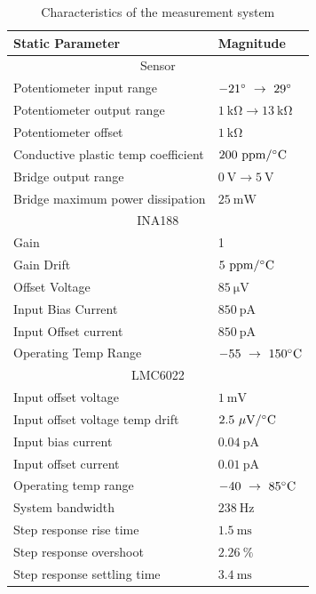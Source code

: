 \documentclass[10pt,twocolumn]{witseiepaper}
\begin{document}
\begin{table}[h!]
	\caption{Characteristics of the measurement system} \label{tab:static}
	\begin{tabular}{|p{}| p{}|}
		\hline
		\textbf{Static Parameter} & \textbf{Magnitude} \\ \hline
		\multicolumn{2}{|c|}{Sensor} \\ \hline
		Potentiometer input range & $-21^\circ~\rightarrow~29^\circ$\\
		Potentiometer output range & $\mathrm{1~k\Omega \rightarrow 13~k\Omega}$\\
		Potentiometer offset & $\mathrm{1~k\Omega}$\\
		Conductive plastic temp coefficient & $\mathrm{200~ppm/^\circ C}$ \\
		Bridge output range & $\mathrm{0~V \rightarrow 5~V}$\\
		Bridge maximum power dissipation & $\mathrm{25~mW}$ \\ \hline
		\multicolumn{2}{|c|}{INA188} \\ \hline
		Gain & 1\\
		Gain Drift & $\mathrm{5~ppm/^\circ C}$ \\
		Offset Voltage & $\mathrm{85~\mu V}$ \\
		Input Bias Current & $\mathrm{850~pA}$\\
		Input Offset current & $\mathrm{850~pA}$\\
		Operating Temp Range & $\mathrm{-55~\rightarrow~150^\circ C}$\\ \hline
		\multicolumn{2}{|c|}{LMC6022} \\ \hline
		Input offset voltage & $\mathrm{1~m V}$ \\
		Input offset voltage temp drift& $\mathrm{2.5~\mu V/ ^\circ C}$ \\
		Input bias current & $\mathrm{0.04~pA}$\\
		Input offset current & $\mathrm{0.01~pA}$\\
		Operating temp range & $\mathrm{-40~\rightarrow~85^\circ C}$\\ \hline
		System bandwidth & $238~\mathrm{Hz}$ \\
		Step response rise time & $1.5~\mathrm{ms}$ \\
		Step response overshoot & $2.26~\%$ \\
		Step response settling time & $3.4~\mathrm{ms}$ \\
		\hline
	\end{tabular}
\end{table}
\end{document}
